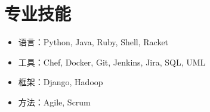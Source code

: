 \documentclass{resume}
\begin{document}

\section{专业技能}
\begin{itemize}[parsep=0.5ex]
  \item 语言：Python, Java, Ruby, Shell, Racket
  \item 工具：Chef, Docker, Git, Jenkins, Jira, SQL, UML
  \item 框架：Django, Hadoop
  \item 方法：Agile, Scrum
\end{itemize}

%
%


%
%




\end{document}
